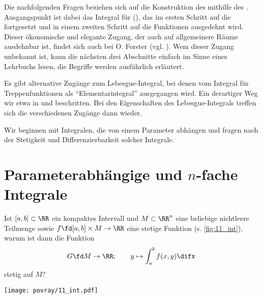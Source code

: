 Die nachfolgenden Fragen beziehen sich auf die Konstruktion des 
 mithilfe des 
. 
Ausgangspunkt ist dabei das Integral für 
 (), das im ersten Schritt auf die 
fortgesetzt und in einem zweiten Schritt auf die 
Funktionen ausgedehnt wird. Dieser ökonomische und elegante Zugang, der 
auch auf allgemeinere Räume ausdehnbar ist, findet sich {\zB} auch 
bei O. Forster (vgl. \citep{Forster}). Wem dieser Zugang unbekannt ist, 
kann die nächsten drei Abschnitte einfach im Sinne eines Lehrbuchs 
lesen, die Begriffe werden ausführlich erläutert. 

Es gibt alternative Zugänge zum Lebesgue-Integral, bei 
denen {\zB} vom Integral für Treppenfunktionen als 
"`Elementarintegral"' ausgegangen wird. Ein derartiger 
Weg wir etwa in \citep{Koenig} und 
\citep{Fritzsche} beschritten. Bei den Eigenschaften des 
Lebesgue-Integrals treffen sich die verschiedenen Zugänge dann wieder. 

Wir beginnen mit Integralen, die 
von einem Parameter abhängen und fragen nach der Stetigkeit und 
Differenzierbarkeit solcher Integrale.

\section{Parameterabhängige und $n$-fache Integrale}
\label{paramintegrale}

\begin{frage}\label{11_paramstet}
  Ist $[a,b]\subset\RR$ ein kompaktes Intervall und $M\subset\RR^n$ eine 
  beliebige nichtleere Teilmenge sowie $f\fd [a,b]\times M \to \RR$ 
  eine stetige Funktion (s. \Abb\ref{fig:11_int}), warum ist dann die Funktion 
  \[
  G \fd M \to\RR; \qquad y \mapsto \int_a^b f(x,y) \difx
  \]
  stetig auf $M$? 

  \begin{center}
    \texttt{[image: povray/11\_int.pdf]}
    \label{fig:11_int}
  \end{center}
\end{frage}

